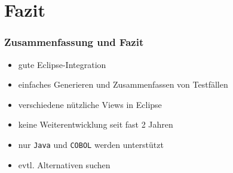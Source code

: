 \documentclass{beamer}
\begin{document}
  \section{Fazit}
  \begin{frame}\frametitle{Zusammenfassung und Fazit}
    \begin{itemize}
      \item gute Eclipse-Integration
      \item einfaches Generieren und Zusammenfassen von Testfällen
      \item verschiedene nützliche Views in Eclipse
      \item keine Weiterentwicklung seit fast 2 Jahren
      \item nur \texttt{Java} und \texttt{COBOL} werden unterstützt
      \item evtl. Alternativen suchen
    \end{itemize}
  \end{frame}
\end{document}
